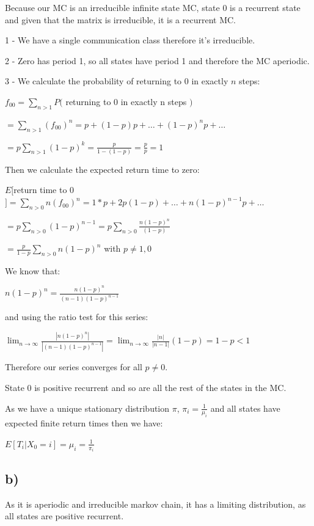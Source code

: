 \documentclass[]{article}
\begin{document}
\newpage

Because our MC is an irreducible infinite state MC, state 0 is a
recurrent state and given that the matrix is irreducible, it is a
recurrent MC.

1 - We have a single communication class therefore it's irreducible.

2 - Zero has period 1, so all states have period 1 and therefore the MC
aperiodic.

3 - We calculate the probability of returning to 0 in exactly \(n\)
steps:

\(f_{00} = \sum_{n > 1} P(\) returning to 0 in exactly n steps \()\)

\(= \sum_{n > 1} (f_{00})^{n} = p + (1-p)p + \dots + (1-p)^{n} p + \dots\)

\(= p \sum_{n > 1} (1-p)^{k} = \frac{p}{1 - (1 - p)} = \frac{p}{p} = 1\)

Then we calculate the expected return time to zero:

\(E[\)return time to
0\(] = \sum_{n > 0} n(f_{00})^{n} = 1*p + 2p(1-p) + \dots + n(1-p)^{n-1} p + \dots\)

\(= p \sum_{n>0} (1-p)^{n-1} = p \sum_{n>0} \frac{n(1-p)^{n}}{(1-p)}\)

\(= \frac{p}{1-p} \sum_{n>0} n(1-p)^{n}\) with \(p \neq 1,0\)

We know that:

\(n(1-p)^{n} = \frac{n(1-p)^{n}}{(n-1)(1-p)^{n-1}}\)

and using the ratio test for this series:

\(\lim_{n \rightarrow \infty} \frac{|n(1-p)^{n}|}{|(n-1)(1-p)^{n-1}|} = \lim_{n \rightarrow \infty} \frac{|n|}{|n-1|} (1-p) = 1-p < 1\)

Therefore our series converges for all \(p \neq 0\).

State 0 is positive recurrent and so are all the rest of the states in
the MC.

As we have a unique stationary distribution \(\pi\),
\(\pi_{i} = \frac{1}{\mu_{i}}\) and all states have expected finite
return times then we have:

\(E[T_{i}|X_{0} = i] = \mu_{i} = \frac{1}{\pi_{i}}\)

\newpage

\hypertarget{b-1}{%
\subsection{b)}\label{b-1}}

As it is aperiodic and irreducible markov chain, it has a limiting
distribution, as all states are positive recurrent.
\end{document}
